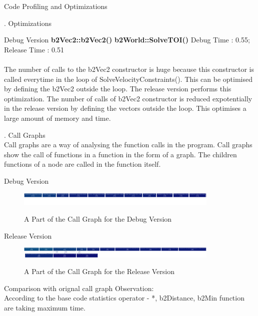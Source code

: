 \documentclass[a4paper,11pt]{resume}
\begin{document}
\begin{rSection}{{\heading Code Profiling and Optimizations}}
\begin{rSubsection}{{. Optimizations}}{}{}{}
\begin{rSubsection}{{ Debug Version}}{}{}{}
\textbf{b2Vec2::b2Vec2()}  \newline
\textbf{b2World::SolveTOI()} \newline
Debug Time : 0.55; Release Time : 0.51 \\ \\
The number of calls to the b2Vec2 constructor is huge because this constructor is called everytime in the loop of SolveVelocityConstraints(). This can be optimised by defining the b2Vec2 outside the loop.
The release version performs this optimization. The number of calls of b2Vec2 constructor is reduced expotentially in the release version by defining the vectors outside the loop. This optimises a large amount of memory and time.
\end{rSubsection}
\end{rSubsection}
\newpage
\begin{rSubsection}{{. Call Graphs}}{}{}{} 
\\
Call graphs are a way of analysing the function calls in the program. Call graphs show the call of functions in a function in the form of a graph. The children functions of a node are called in the function itself. \\
\begin{rSubsection}{{\heading Debug Version}}{}{}{}
\begin{figure}[h]
\centering
\includegraphics[width=0.86\textwidth]{analysisDebug}
\label{fig:init}
\caption{A Part of the Call Graph for the Debug Version}
\end{figure}
\end{rSubsection}
\begin{rSubsection}{{\heading Release Version}}{}{}{}
\begin{figure}[h]
\centering
\includegraphics[width=0.86\textwidth]{releaseanalysis}
\label{fig:init}
\caption{A Part of the Call Graph for the Release Version}
\end{figure}
\end{rSubsection}
\end{rSubsection}
\begin{rSubsection}{{\heading Comparison with orignal call graph}}{}{}{}
Observation:\\
According to the base code  statistics operator - *, b2Distance, b2Min  function are taking maximum time.

\end{rSubsection}
\end{rSection}
\end{document}

